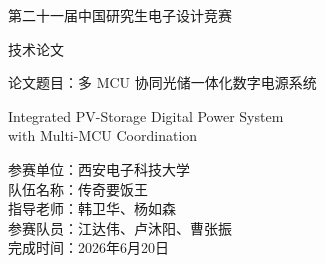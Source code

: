 ﻿%
\begin{titlepage}
\centering
\vspace*{1cm}
{\heiti 第二十一届中国研究生电子设计竞赛\par}
\vspace{0.5cm}
{\heiti 技术论文\par}
\vspace{1.5cm}
{\heiti 论文题目：多 MCU 协同光储一体化数字电源系统\par}
\vspace{0.3cm}
{
\setlength{\baselineskip}{18pt}
\sffamily
Integrated PV-Storage Digital Power System\\ with Multi-MCU Coordination\par
}
\vspace{3cm}
\begin{flushleft}
\hspace*{4cm}
\begin{minipage}{0.6\textwidth}
\heiti
参赛单位：西安电子科技大学\\[0.4cm]
队伍名称：传奇要饭王\\[0.4cm]
指导老师：韩卫华、杨如森\\[0.4cm]
参赛队员：江达伟、卢沐阳、曹张振\\[0.4cm]
完成时间：2026年6月20日
\end{minipage}
\end{flushleft}
\end{titlepage}

